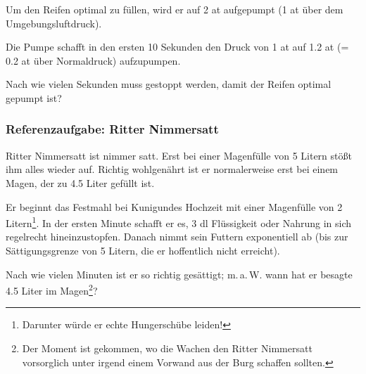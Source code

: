 Um den Reifen optimal zu füllen, wird er auf 2 at aufgepumpt (1 at
über dem Umgebungsluftdruck).

Die Pumpe schafft in den ersten 10 Sekunden den Druck von 1 at auf 1.2
at (= 0.2 at über Normaldruck) aufzupumpen.

Nach wie vielen Sekunden muss gestoppt werden, damit der Reifen
optimal gepumpt ist?

\newpage

\subsubsection{Referenzaufgabe: Ritter
  Nimmersatt}
Ritter Nimmersatt ist nimmer satt. Erst bei einer Magenfülle von
5 Litern stößt ihm alles wieder auf. Richtig wohlgenährt ist er
normalerweise erst bei einem Magen, der zu 4.5 Liter gefüllt ist.

Er beginnt das Festmahl bei Kunigundes Hochzeit mit einer Magenfülle
von 2 Litern\footnote{Darunter würde er echte Hungerschübe
  leiden!}. In der ersten Minute schafft er es, 3 dl Flüssigkeit oder Nahrung
in sich regelrecht hineinzustopfen. Danach nimmt sein Futtern
exponentiell ab (bis zur Sättigungsgrenze von 5 Litern, die er
hoffentlich nicht erreicht).

Nach wie vielen Minuten ist er so richtig gesättigt; m.\,a.\,W. wann
hat er besagte 4.5 Liter im Magen\footnote{Der Moment ist gekommen, wo
  die Wachen den Ritter Nimmersatt vorsorglich unter irgend einem Vorwand aus der Burg schaffen sollten.}?



\newpage
